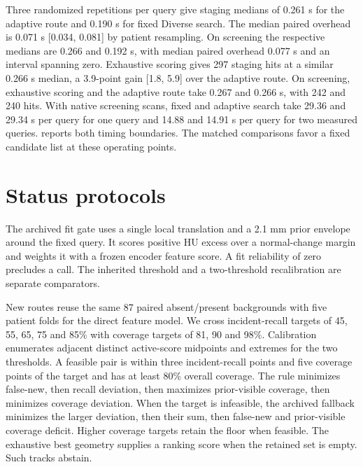 Three randomized repetitions per query give staging medians of 0.261 s for the adaptive route and 0.190 s for fixed Diverse search. The median paired overhead is 0.071 s [0.034, 0.081] by patient resampling. On screening the respective medians are 0.266 and 0.192 s, with median paired overhead 0.077 s and an interval spanning zero. Exhaustive scoring gives 297 staging hits at a similar 0.266 s median, a 3.9-point gain [1.8, 5.9] over the adaptive route. On screening, exhaustive scoring and the adaptive route take 0.267 and 0.266 s, with 242 and 240 hits. With native screening scans, fixed and adaptive search take 29.36 and 29.34 s per query for one query and 14.88 and 14.91 s per query for two measured queries.  reports both timing boundaries. The matched comparisons favor a fixed candidate list at these operating points.

\begin{table}[!t]
\centering\small
\caption{Matched cost of fixed and adaptive routes. Hit counts use the full cohorts. Local values are median / p90 seconds over the median of three randomized runs per query. The native screening replay measures one query on eight pairs and two distinct queries on four of those pairs. Native values are medians in seconds per query.}
\label{tab:decision-cost}

\end{table}

\section{Status protocols}
\label{sec:supp-status-scope}
The archived fit gate uses a single local translation and a 2.1 mm prior envelope around the fixed query. It scores positive HU excess over a normal-change margin and weights it with a frozen encoder feature score. A fit reliability of zero precludes a call. The inherited threshold and a two-threshold recalibration are separate comparators.

New routes reuse the same 87 paired absent/present backgrounds with five patient folds for the direct feature model. We cross incident-recall targets of 45, 55, 65, 75 and 85\% with coverage targets of 81, 90 and 98\%. Calibration enumerates adjacent distinct active-score midpoints and extremes for the two thresholds. A feasible pair is within three incident-recall points and five coverage points of the target and has at least 80\% overall coverage. The rule minimizes false-new, then recall deviation, then maximizes prior-visible coverage, then minimizes coverage deviation. When the target is infeasible, the archived fallback minimizes the larger deviation, then their sum, then false-new and prior-visible coverage deficit. Higher coverage targets retain the floor when feasible. The exhaustive best geometry supplies a ranking score when the retained set is empty. Such tracks abstain.

